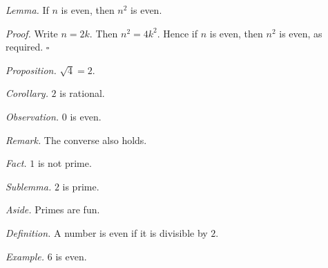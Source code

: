 \textit{Lemma.} If $n$ is even, then $n^{2}$ is even.

\textit{Proof.} Write $n = 2k$.
Then $n^{2} = 4k^{2}$.
Hence if $n$ is even, then $n^{2}$ is even, as required. \hfill$\square$

\textit{Proposition.} $\sqrt{4} = 2$.

\textit{Corollary.} $2$ is rational.

\textit{Observation.} $0$ is even.

\textit{Remark.} The converse also holds.

\textit{Fact.} $1$ is not prime.

\textit{Sublemma.} $2$ is prime.

\textit{Aside.} Primes are fun.

\textit{Definition.} A number is even if it is divisible by $2$.

\textit{Example.} $6$ is even.